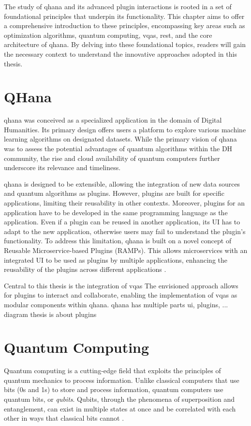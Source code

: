 \documentclass[
  a4paper,  %
  twoside,  %
  bibliography=totoc,
  headsepline,
  cleardoublepage=empty,
  parskip=half,
  draft=false
]{scrbook}
\begin{document}
The study of \gls{qhana} and its advanced plugin interactions is rooted in a set of foundational principles that underpin its functionality.
This chapter aims to offer a comprehensive introduction to these principles, encompassing key areas such as optimization algorithms, quantum computing, \glspl{vqa}, \gls{rest}, and the core architecture of \gls{qhana}.
By delving into these foundational topics, readers will gain the necessary context to understand the innovative approaches adopted in this thesis.

\section{QHana}
\label{sec:qhana}

\gls{qhana} was conceived as a specialized application in the domain of Digital Humanities.
Its primary design offers users a platform to explore various machine learning algorithms on designated datasets.
While the primary vision of \gls{qhana} was to assess the potential advantages of quantum algorithms within the DH community, the rise and cloud availability of quantum computers further underscore its relevance and timeliness.

\gls{qhana} is designed to be extensible, allowing the integration of new data sources and quantum algorithms as plugins.
However, plugins are built for specific applications, limiting their reusability in other contexts.
Moreover, plugins for an application have to be developed in the same programming language as the application.
Even if a plugin can be reused in another application, its UI has to adapt to the new application, otherwise users may fail to understand the plugin's functionality.
To address this limitation, \gls{qhana} is built on a novel concept of Reusable Microservice-based Plugins (RAMPs).
This allows microservices with an integrated UI to be used as plugins by multiple applications, enhancing the reusability of the plugins across different applications \cite{Buehler2022}.

Central to this thesis is the integration of \glspl{vqa}
The envisioned approach allows for plugins to interact and collaborate, enabling the implementation of \glspl{vqa} as modular components within \gls{qhana}.
qhana has multiple parts ui, plugins, ... diagram
thesis is about plugins
\section{Quantum Computing}
\label{sec:quantumComputing}
Quantum computing is a cutting-edge field that exploits the principles of quantum mechanics to process information.
Unlike classical computers that use bits (0s and 1s) to store and process information, quantum computers use quantum bits, or \emph{qubits}.
Qubits, through the phenomena of superposition and entanglement, can exist in multiple states at once and be correlated with each other in ways that classical bits cannot \cite{Nielsen2010}.
\end{document}
